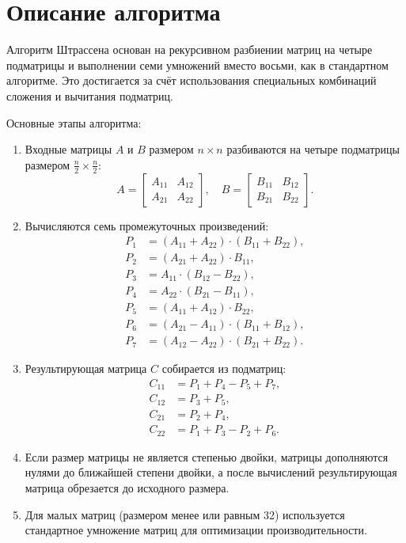 \documentclass[14pt,a4paper]{extarticle}
\begin{document}
\section{Описание алгоритма}

Алгоритм Штрассена основан на рекурсивном разбиении матриц на четыре подматрицы и выполнении семи умножений вместо восьми, как в стандартном алгоритме. Это достигается за счёт использования специальных комбинаций сложения и вычитания подматриц.

Основные этапы алгоритма:

\begin{enumerate}
    \item Входные матрицы \(A\) и \(B\) размером \(n \times n\) разбиваются на четыре подматрицы размером \(\frac{n}{2} \times \frac{n}{2}\):
    \[
    A = \begin{bmatrix} A_{11} & A_{12} \\ A_{21} & A_{22} \end{bmatrix}, \quad
    B = \begin{bmatrix} B_{11} & B_{12} \\ B_{21} & B_{22} \end{bmatrix}.
    \]
    \item Вычисляются семь промежуточных произведений:
    \[
    \begin{aligned}
        P_1 &= (A_{11} + A_{22}) \cdot (B_{11} + B_{22}), \\
        P_2 &= (A_{21} + A_{22}) \cdot B_{11}, \\
        P_3 &= A_{11} \cdot (B_{12} - B_{22}), \\
        P_4 &= A_{22} \cdot (B_{21} - B_{11}), \\
        P_5 &= (A_{11} + A_{12}) \cdot B_{22}, \\
        P_6 &= (A_{21} - A_{11}) \cdot (B_{11} + B_{12}), \\
        P_7 &= (A_{12} - A_{22}) \cdot (B_{21} + B_{22}).
    \end{aligned}
    \]
    \item Результирующая матрица \(C\) собирается из подматриц:
    \[
    \begin{aligned}
        C_{11} &= P_1 + P_4 - P_5 + P_7, \\
        C_{12} &= P_3 + P_5, \\
        C_{21} &= P_2 + P_4, \\
        C_{22} &= P_1 + P_3 - P_2 + P_6.
    \end{aligned}
    \]
    \item Если размер матрицы не является степенью двойки, матрицы дополняются нулями до ближайшей степени двойки, а после вычислений результирующая матрица обрезается до исходного размера.
    \item Для малых матриц (размером менее или равным 32) используется стандартное умножение матриц для оптимизации производительности.
\end{enumerate}
\end{document}
